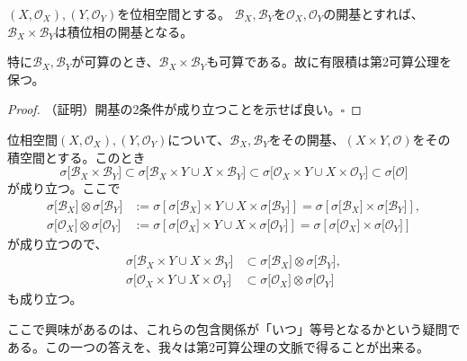 \documentclass[../root.tex]{subfiles}
\begin{document}
\begin{Prop}{}{}
$ ( X, \mathcal{O}_{X} ), ( Y, \mathcal{O}_{Y} ) $を位相空間とする。
$ \mathcal{B}_{X}, \mathcal{B}_{Y} $を$ \mathcal{O}_{X}, \mathcal{O}_{Y} $の開基とすれば、$ \mathcal{B}_{X}\times\mathcal{B}_{Y} $は積位相の開基となる。

特に$ \mathcal{B}_{X}, \mathcal{B}_{Y} $が可算のとき、$ \mathcal{B}_{X}\times\mathcal{B}_{Y} $も可算である。故に有限積は第2可算公理を保つ。
\end{Prop}

\begin{proof}
（証明）開基の2条件が成り立つことを示せば良い。$ \square $
\end{proof}

位相空間$ ( X, \mathcal{O}_{X} ), ( Y, \mathcal{O}_{Y} ) $について、$ \mathcal{B}_{X}, \mathcal{B}_{Y} $をその開基、$ ( X\times Y, \mathcal{O} ) $をその積空間とする。このとき
\[ \sigma\lbrack \mathcal{B}_{X}\times\mathcal{B}_{Y} \rbrack \subset \sigma\lbrack \mathcal{B}_{X}\times Y\cup X\times\mathcal{B}_{Y} \rbrack \subset \sigma\lbrack \mathcal{O}_{X}\times Y\cup X\times\mathcal{O}_{Y} \rbrack \subset \sigma\lbrack \mathcal{O} \rbrack \]
が成り立つ。ここで
\begin{align*}
\sigma\lbrack \mathcal{B}_{X} \rbrack\otimes\sigma\lbrack \mathcal{B}_{Y} \rbrack &:= \sigma\left\lbrack \sigma\lbrack \mathcal{B}_{X} \rbrack\times Y\cup X\times\sigma\lbrack \mathcal{B}_{Y} \rbrack \right\rbrack = \sigma\left\lbrack \sigma\lbrack \mathcal{B}_{X} \rbrack\times\sigma\lbrack \mathcal{B}_{Y} \rbrack \right\rbrack, \\
\sigma\lbrack \mathcal{O}_{X} \rbrack\otimes\sigma\lbrack \mathcal{O}_{Y} \rbrack &:= \sigma\left\lbrack \sigma\lbrack \mathcal{O}_{X} \rbrack\times Y\cup X\times\sigma\lbrack \mathcal{O}_{Y} \rbrack \right\rbrack = \sigma\left\lbrack \sigma\lbrack \mathcal{O}_{X} \rbrack\times\sigma\lbrack \mathcal{O}_{Y} \rbrack \right\rbrack
\end{align*}
が成り立つので、
\begin{align*}
\sigma\lbrack \mathcal{B}_{X}\times Y\cup X\times\mathcal{B}_{Y} \rbrack &\subset \sigma\lbrack \mathcal{B}_{X} \rbrack\otimes\sigma\lbrack \mathcal{B}_{Y} \rbrack, \\
\sigma\lbrack \mathcal{O}_{X}\times Y\cup X\times\mathcal{O}_{Y} \rbrack &\subset \sigma\lbrack \mathcal{O}_{X} \rbrack\otimes\sigma\lbrack \mathcal{O}_{Y} \rbrack
\end{align*}
も成り立つ。

ここで興味があるのは、これらの包含関係が「いつ」等号となるかという疑問である。この一つの答えを、我々は第2可算公理の文脈で得ることが出来る。
\end{document}
